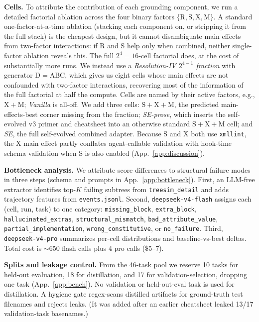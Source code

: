 \documentclass{article}
\begin{document}
\textbf{Cells.} To attribute the contribution of each grounding component, we run a detailed factorial ablation across the four binary factors $\{\mathrm{R, S, X, M}\}$. A standard one-factor-at-a-time ablation (stacking each component on, or stripping it from the full stack) is the cheapest design, but it cannot disambiguate main effects from two-factor interactions: if R and S help only when combined, neither single-factor ablation reveals this. The full $2^4 = 16$-cell factorial does, at the cost of substantially more runs. We instead use a \emph{Resolution-IV $2^{4-1}$ fraction} with generator $\mathrm{D}{=}\mathrm{ABC}$, which gives us eight cells whose main effects are not confounded with two-factor interactions, recovering most of the information of the full factorial at half the compute. Cells are named by their active factors, e.g., $\mathrm{X+M}$; \emph{Vanilla} is all-off. We add three cells: $\mathrm{S+X+M}$, the predicted main-effects-best corner missing from the fraction; \emph{SE-prose}, which inserts the self-evolved v3 primer and cheatsheet into an otherwise standard $\mathrm{S+X+M}$ cell; and \emph{SE}, the full self-evolved combined adapter. Because S and X both use \texttt{xmllint}, the X main effect partly conflates agent-callable validation with hook-time schema validation when S is also enabled (App.~\ref{app:discussion}).

\textbf{Bottleneck analysis.} We attribute score differences to structural failure modes in three steps (schema and prompts in App.~\ref{app:bottleneck}). First, an LLM-free extractor identifies top-$K$ failing subtrees from \texttt{treesim\_detail} and adds trajectory features from \texttt{events.jsonl}. Second, \texttt{deepseek-v4-flash} assigns each (cell, run, task) to one category: \texttt{missing\_block}, \texttt{extra\_block}, \texttt{hallucinated\_extras}, \texttt{structural\_mismatch}, \texttt{bad\_attribute\_value}, \texttt{partial\_implementation}, \texttt{wrong\_constitutive}, or \texttt{no\_failure}. Third, \texttt{deepseek-v4-pro} summarizes per-cell distributions and baseline-vs-best deltas. Total cost is ${\sim}650$ flash calls plus 4 pro calls ($\$5\text{--}7$).

\textbf{Splits and leakage control.} From the 46-task pool we reserve 10 tasks for held-out evaluation, 18 for distillation, and 17 for validation-selection, dropping one task (App.~\ref{app:bench}). No validation or held-out-eval task is used for distillation. A hygiene gate regex-scans distilled artifacts for ground-truth test filenames and rejects leaks. (It was added after an earlier cheatsheet leaked 13/17 validation-task basenames.)
\end{document}

